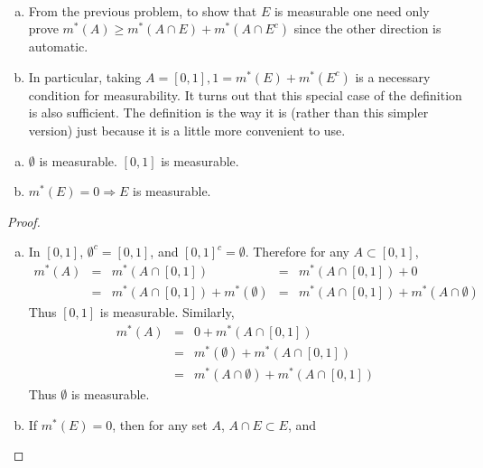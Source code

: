\begin{rmk}~ %
	\begin{enumerate}[(a)]
		\item From the previous problem, to show that $E$ is measurable 
		one need only prove 
		$m^\ast(A) \ge m^\ast(A\cap E) + m^\ast(A\cap E^c)$ since the other 
		direction is automatic. 
		\item In particular, taking $A = [0,1], 1 = m^\ast(E)+m^\ast(E^c)$ 
		is a necessary condition for measurability. It turns out that this 
		special case of the definition is also sufficient. The definition 
		is the way it is (rather than this simpler version) just because 
		it is a little more convenient to use.
	\end{enumerate}
\end{rmk}

\begin{pblm}%
{\color{gray!10}{thing}}
\begin{enumerate}[(a)]
	\item $\emptyset$ is measurable. $[0,1]$ is measurable.
	\item $m^\ast(E) = 0 \Rightarrow E$ is measurable. 
\end{enumerate}
\begin{proof}
{\color{gray!10}{thing}}
\begin{enumerate}[(a)]
	\item In $[0,1]$, $\emptyset^c = [0,1]$, and $[0,1]^c = \emptyset$. Therefore 
	for any $A \subset [0,1]$, 
	\begin{equation*}
		\begin{array}{rcccl}
		m^\ast(A) & = & m^\ast(A \cap [0,1]) & = & m^\ast(A \cap [0,1]) + 0\\
			 & = & m^\ast(A \cap [0,1]) + m^\ast(\emptyset) & = & m^\ast(A \cap [0,1]) + m^\ast(A \cap \emptyset)
		\end{array}
	\end{equation*}
	Thus $[0,1]$ is measurable. 
	Similarly, 
	\begin{equation*}
		\begin{array}{rcl}
		m^\ast(A) & = & 0 + m^\ast(A \cap [0,1])\\
			 & = & m^\ast(\emptyset)         + m^\ast(A \cap [0,1]) \\
			 & = & m^\ast(A \cap \emptyset)  + m^\ast(A \cap [0,1]) 
		\end{array}
	\end{equation*}
	Thus $\emptyset$ is measurable. 
	\item If $m^\ast(E) = 0$, then for any set $A$, $A \cap E \subset E$, and 

\end{enumerate}
\end{proof}
\end{pblm}

